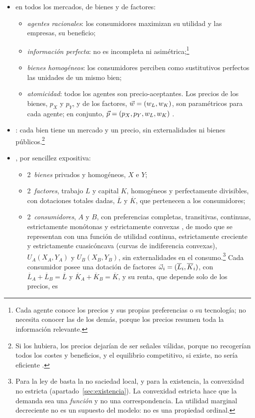 \documentclass[11pt]{article}
\begin{document}
\begin{itemize}
\item {} en todos los mercados, de bienes y de factores:
  \begin{itemize}
  \item \emph{agentes racionales}: los consumidores maximizan su utilidad y las empresas, su beneficio;
  \item \emph{información perfecta}: no es incompleta ni asimétrica;\footnote{Cada agente conoce los precios y sus propias preferencias o su tecnología; no necesita conocer las de los demás, porque los precios resumen toda la información relevante.}
  \item \emph{bienes homogéneos}: los consumidores perciben como sustitutivos perfectos las unidades de un mismo bien;
  \item \emph{atomicidad}: todos los agentes son precio-aceptantes. Los precios de los bienes, $p_X$ y $p_Y$, y de los factores, $\vec{w}=(w_L,w_K)$, son paramétricos para cada agente; en conjunto, $\vec{p}=(p_X,p_Y,w_L,w_K)$ .
  \end{itemize}
\item {}: cada bien tiene un mercado y un precio, sin externalidades ni bienes públicos.\footnote{Si los hubiera, los precios dejarían de ser señales válidas, porque no recogerían todos los costes y beneficios, y el equilibrio competitivo, si existe, no sería eficiente .}
\item {}\nocite{Bator1957Simple}, por sencillez expositiva:
  \begin{itemize}
  \item 2~\emph{bienes} privados y homogéneos, $X$ e $Y$;
  \item 2~\emph{factores}, trabajo $L$ y capital $K$, homogéneos y perfectamente divisibles, con dotaciones totales dadas, $\overline{L}$ y $\overline{K}$, que pertenecen a los consumidores;
  \item 2~\emph{consumidores}, $A$ y $B$, con preferencias completas, transitivas, continuas, estrictamente monótonas y estrictamente convexas , de modo que se representan con una función de utilidad continua, estrictamente creciente y estrictamente cuasicóncava (curvas de indiferencia convexas), $U_A(X_A,Y_A)$ y $U_B(X_B,Y_B)$, sin externalidades en el consumo.\footnote{Para la ley de  basta la no saciedad local, y para la existencia, la convexidad no estricta (apartado~\ref{sec:existencia}). La convexidad estricta hace que la demanda sea una \emph{función} y no una correspondencia. La utilidad marginal decreciente no es un supuesto del modelo: no es una propiedad ordinal.} Cada consumidor posee una dotación de factores $\vec{\omega}_i=(\overline{L}_i,\overline{K}_i)$, con $\overline{L}_A+\overline{L}_B=\overline{L}$ y $\overline{K}_A+\overline{K}_B=\overline{K}$, y su renta, que depende solo de los precios, es

\end{itemize}
\end{itemize}
\end{document}
